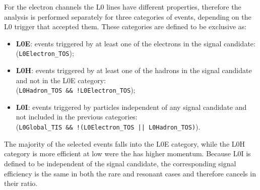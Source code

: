 For the electron channels the L0 lines have different properties, therefore the analysis 
is performed separately for three categories of events, depending on the L0 trigger that 
accepted them. These categories are defined to be exclusive as:
%
\begin{itemize}
\item {\bf L0E}: events triggered by at least one of the electrons in the signal candidate: (\verb!L0Electron_TOS!);
\item {\bf L0H}: events triggered by at least one of the hadrons in the signal candidate and not in the L0E category: \\
 (\verb|L0Hadron_TOS && !L0Electron_TOS|);
\item {\bf L0I}: events triggered by particles independent of any signal candidate and not included in the previous categories: \\
(\verb|L0Global_TIS && !(L0Electron_TOS |\verb!|| L0Hadron_TOS)!).
\end{itemize}

The majority of the selected events falls into the L0E category, while
the L0H category is more efficient at low \qsq were the \Kstarz has higher momentum.
Because L0I is defined to be independent of the signal candidate, the corresponding
signal efficiency is the same in both the rare and resonant cases and therefore cancels in their ratio.

